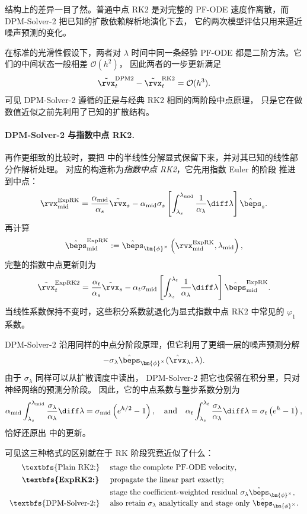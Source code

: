 结构上的差异一目了然。普通中点 RK2 是对完整的 PF-ODE
速度作离散，而 DPM-Solver-2 把已知的扩散依赖解析地演化下去，
它的两次模型评估只用来逼近噪声预测的变化。

在标准的光滑性假设下，两者对 $\lambda$ 时间中同一条经验 PF-ODE
都是二阶方法。它们的中间状态一般相差 $\mathcal O(h^2)$，
因此两者的一步更新满足
\[
\tilde\rvx_t^{\mathrm{DPM2}}
-
\tilde\rvx_t^{\mathrm{RK2}}
=
\mathcal O(h^3).
\]
可见 DPM-Solver-2 遵循的正是与经典 RK2 相同的两阶段中点原理，
只是它在做数值近似之前先利用了已知的扩散结构。

\paragraph{DPM-Solver-2 与指数中点 RK2.}
再作更细致的比较时，要把 
中的半线性分解显式保留下来，并对其已知的线性部分作解析处理。
对应的构造称为\emph{指数中点 RK2}，它先用指数 Euler 的阶段
推进到中点：
\[
\rvx_{\mathrm{mid}}^{\mathrm{ExpRK}}
=
\frac{\alpha_{\mathrm{mid}}}{\alpha_s}\tilde\rvx_s
-
\alpha_{\mathrm{mid}}\sigma_s
\left[
\int_{\lambda_s}^{\lambda_{\mathrm{mid}}}
\frac{1}{\alpha_\lambda}\diff\lambda
\right]
\hat\beps_s.
\]
再计算
\[
\hat\beps_{\mathrm{mid}}^{\mathrm{ExpRK}}
:=
\hat\beps_{\bm{\phi}^\times}
\left(
\rvx_{\mathrm{mid}}^{\mathrm{ExpRK}},
\lambda_{\mathrm{mid}}
\right),
\]
完整的指数中点更新则为
\[
\tilde\rvx_t^{\mathrm{ExpRK2}}
=
\frac{\alpha_t}{\alpha_s}\tilde\rvx_s
-
\alpha_t\sigma_{\mathrm{mid}}
\left[
\int_{\lambda_s}^{\lambda_t}
\frac{1}{\alpha_\lambda}\diff\lambda
\right]
\hat\beps_{\mathrm{mid}}^{\mathrm{ExpRK}}.
\]
当线性系数保持不变时，这些积分系数就退化为显式指数中点 RK2 中常见的 $\varphi_1$ 系数。

DPM-Solver-2 沿用同样的中点分阶段原理，但它利用了更细一层的噪声预测分解
\[
-\sigma_\lambda
\hat\beps_{\bm{\phi}^\times}(\hat\rvx_\lambda,\lambda).
\]
由于 $\sigma_\lambda$ 同样可以从扩散调度中读出，
DPM-Solver-2 把它也保留在积分里，只对神经网络的预测分阶段。
因此，它的中点系数与整步系数分别为
\[
\alpha_{\mathrm{mid}}
\int_{\lambda_s}^{\lambda_{\mathrm{mid}}}
\frac{\sigma_\lambda}{\alpha_\lambda}\diff\lambda
=
\sigma_{\mathrm{mid}}
\left(e^{h/2}-1\right),
\quad \text{and}\quad
\alpha_t
\int_{\lambda_s}^{\lambda_t}
\frac{\sigma_\lambda}{\alpha_\lambda}\diff\lambda
=
\sigma_t
\left(e^h-1\right),
\]
恰好还原出  中的更新。

可见这三种格式的区别就在于 RK 阶段究竟近似了什么：
\[
\begin{array}{rl}
\text{\textbfs{Plain RK2:} }
&
\text{stage the complete PF-ODE velocity},
\\[4pt]

\textbf{\textbfs{ExpRK2:} }
&
\begin{aligned}[t]
&\text{propagate the linear part exactly;}\\
&\text{stage the coefficient-weighted residual }
\sigma_\lambda\hat\beps_{\bm{\phi}^\times},
\end{aligned}
\\[6pt]

\text{\textbfs{DPM-Solver-2:} }
&
\text{also retain }\sigma_\lambda\text{ analytically and stage only }
\hat\beps_{\bm{\phi}^\times}.
\end{array}
\]


